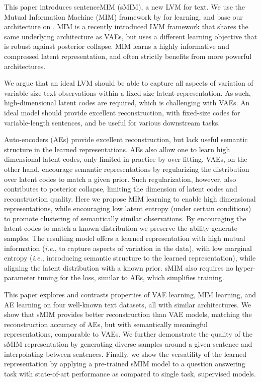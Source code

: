 \documentclass{article}
\newcommand{\ie}{{\em i.e.}}
\begin{document}
This paper introduces sentenceMIM (sMIM), a new LVM for text. We use the Mutual Information Machine (MIM) framework 
by \citet{2019arXiv191003175L} for learning, and base our architecture on \citet{DBLP:journals/corr/BowmanVVDJB15}.
MIM is a recently introduced LVM framework that shares the same underlying architecture 
as VAEs, but uses a different learning objective that is robust against posterior collapse. 
MIM learns a highly informative and compressed latent representation, and often strictly 
benefits from more powerful architectures. 

We argue that an ideal LVM should be able to capture all aspects of variation of variable-size text observations 
within a fixed-size latent representation.
As such, high-dimensional latent codes are required, which is challenging with VAEs.
An ideal  model should provide excellent reconstruction, with fixed-size codes for variable-length sentences,
and be useful for various downstream tasks.

Auto-encoders (AEs)  \cite{NIPS1993_9e3cfc48} provide excellent reconstruction, 
but lack useful semantic structure in the learned representations.
AEs also allow one to learn high dimensional latent codes, only limited in practice by over-fitting.
VAEs, on the other hand, encourage semantic representations by regularizing the distribution over latent codes to match a given prior.
Such regularization, however, also contributes to posterior collapse, limiting the dimension of latent codes and reconstruction quality.
Here we propose MIM learning to enable high dimensional representations, while encouraging low latent entropy (under certain conditions) to promote clustering of semantically similar observations.
By encouraging the latent codes to match a known distribution we preserve the ability generate samples.
The resulting model offers a learned representation with high mutual information (\ie, to capture aspects of 
variation in the data), with low marginal entropy (\ie, introducing semantic structure to the learned representation), 
while aligning the latent distribution with a known prior.
sMIM also requires no hyper-parameter tuning for the loss, similar to AEs, which simplifies training.

This paper explores and contrasts properties of VAE learning, MIM learning, and AE learning on four well-known
text datasets, all with similar architectures.
We show that sMIM provides better reconstruction than VAE models, matching the reconstruction accuracy of AEs,
but with semantically meaningful representations, comparable to VAEs.
We further demonstrate the quality of the sMIM representation by generating diverse 
samples around a given sentence and interpolating between sentences. 
Finally, we show the versatility of the learned representation by applying a pre-trained sMIM 
model to a question answering task with state-of-art performance as compared to single task, supervised models.
\end{document}
